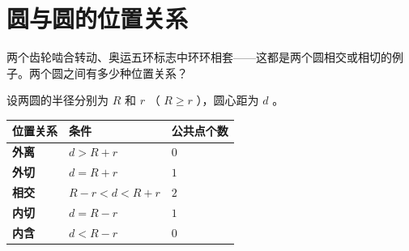 \section*{圆与圆的位置关系}


\begin{explore}


两个齿轮啮合转动、奥运五环标志中环环相套——这都是两个圆相交或相切的例子。两个圆之间有多少种位置关系？

\end{explore}

\begin{understand}


设两圆的半径分别为 $R$ 和 $r$ （ $R \geq r$ ），圆心距为 $d$ 。

\begin{center}
\begin{tabular}{lll}
\toprule
位置关系 & 条件 & 公共点个数 \\
\midrule
\textbf{外离} & $d > R + r$ & $0$ \\
\textbf{外切} & $d = R + r$ & $1$ \\
\textbf{相交} & $R - r < d < R + r$ & $2$ \\
\textbf{内切} & $d = R - r$ & $1$ \\
\textbf{内含} & $d < R - r$ & $0$ \\
\bottomrule
\end{tabular}
\end{center}



\end{understand}
